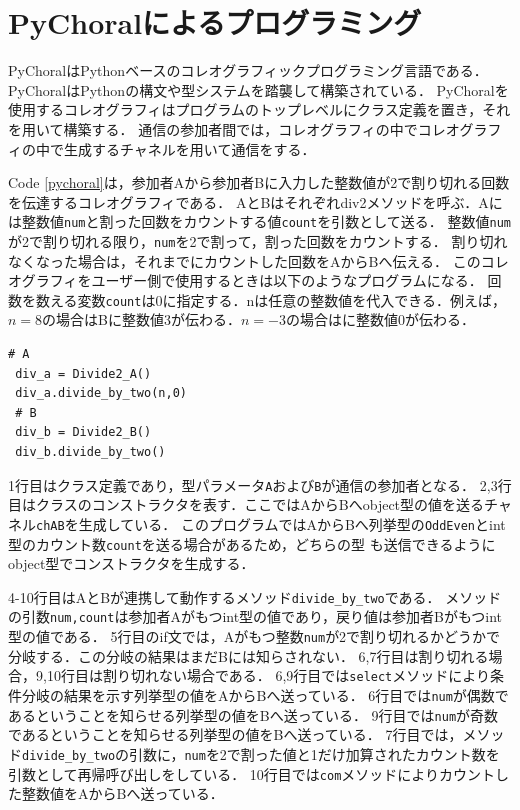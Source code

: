 \documentclass{thesis}
\begin{document}
\chapter{PyChoralによるプログラミング}
PyChoralはPythonベースのコレオグラフィックプログラミング言語である．
PyChoralはPythonの構文や型システムを踏襲して構築されている．
PyChoralを使用するコレオグラフィはプログラムのトップレベルにクラス定義を置き，それを用いて構築する．
通信の参加者間では，コレオグラフィの中でコレオグラフィの中で生成するチャネルを用いて通信をする．

Code \ref{pychoral}は，参加者Aから参加者Bに入力した整数値が2で割り切れる回数を伝達するコレオグラフィである．
AとBはそれぞれ\textsf{div2}メソッドを呼ぶ．Aには整数値\texttt{num}と割った回数をカウントする値\texttt{count}を引数として送る．
整数値\texttt{num}が2で割り切れる限り，\texttt{num}を2で割って，割った回数をカウントする．
割り切れなくなった場合は，それまでにカウントした回数をAからBへ伝える．
このコレオグラフィをユーザー側で使用するときは以下のようなプログラムになる．
回数を数える変数\texttt{count}は0に指定する．nは任意の整数値を代入できる．例えば，$n=8$の場合はBに整数値3が伝わる．$n=-3$の場合はに整数値0が伝わる．

\begin{lstlisting}[numbers=none]
 # A
 div_a = Divide2_A()
 div_a.divide_by_two(n,0)
 # B
 div_b = Divide2_B()
 div_b.divide_by_two()
\end{lstlisting}
1行目はクラス定義であり，型パラメータ\texttt{A}および\texttt{B}が通信の参加者となる．
2,3行目はクラスのコンストラクタを表す．ここではAからBへobject型の値を送るチャネル\texttt{chAB}を生成している．
このプログラムではAからBへ列挙型の\texttt{OddEven}とint型のカウント数\texttt{count}を送る場合があるため，どちらの型
も送信できるようにobject型でコンストラクタを生成する．

4-10行目はAとBが連携して動作するメソッド\texttt{divide\_by\_two}である．
メソッドの引数\texttt{num,count}は参加者Aがもつint型の値であり，戻り値は参加者Bがもつint型の値である．
5行目のif文では，Aがもつ整数\texttt{num}が2で割り切れるかどうかで分岐する．この分岐の結果はまだBには知らされない．
6,7行目は割り切れる場合，9,10行目は割り切れない場合である．
6,9行目では\texttt{select}メソッドにより条件分岐の結果を示す列挙型の値をAからBへ送っている．
6行目では\texttt{num}が偶数であるということを知らせる列挙型の値{}をBへ送っている．
9行目では\texttt{num}が奇数であるということを知らせる列挙型の値{}をBへ送っている．
7行目では，メソッド\texttt{divide\_by\_two}の引数に，\texttt{num}を2で割った値と1だけ加算されたカウント数を引数として再帰呼び出しをしている．
10行目では\texttt{com}メソッドによりカウントした整数値をAからBへ送っている．
\end{document}
